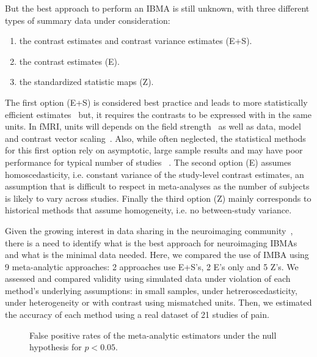 \documentclass[preprint]{elsarticle}
\newcommand{\E}{E}
\newcommand{\ES}{E+S}
\newcommand{\Z}{Z}
\begin{document}
But the best approach to perform an IBMA is still unknown, with three different types of summary data under consideration:
\begin{enumerate}
	\item the contrast estimates and contrast variance estimates (\ES).
	\item the contrast estimates (\E).	
	\item the standardized statistic maps (\Z).		
\end{enumerate}
The first option (\ES) is considered best practice and leads to more statistically efficient estimates~\cite{Cummings2004} but, it requires the contrasts to be expressed with in the same units. In fMRI, units will depends on the field strength~\cite{Chen2016} as well as data, model and contrast vector scaling~\cite{Nichols2012units}. Also, while often neglected, the statistical methods for this first option rely on asymptotic, large sample results and may have poor performance for typical number of studies ~\cite{Greene2012,kosmidis2015,guolo2017}.
The second option (\E) assumes homoscedasticity, i.e. constant variance of the study-level contrast estimates, an assumption that is difficult to respect in meta-analyses as the number of subjects is likely to vary across studies.
Finally the third option (\Z) mainly corresponds to historical methods that assume homogeneity, i.e. no between-study variance. 

Given the growing interest in data sharing in the neuroimaging community~\cite{Poldrack2014,Nichols2017}, there is a need to identify what is the best approach for neuroimaging IBMAs and what is the minimal data needed. Here, we compared the use of IMBA using 9 meta-analytic approaches: 2 approaches use \ES's, 2 \E's only and 5 \Z's. We assessed and compared validity using simulated data under violation of each method's underlying assumptions: in small samples, under hetreroscedasticity, under heterogeneity or with contrast using mismatched units. Then, we estimated the accuracy of each method using a real dataset of 21 studies of pain.


\begin{figure}[t]
	\centering
	\caption{False positive rates of the meta-analytic estimators under the null hypothesis for $p<0.05$.}
	\label{fig_fpr_all}
\end{figure}
\end{document}
